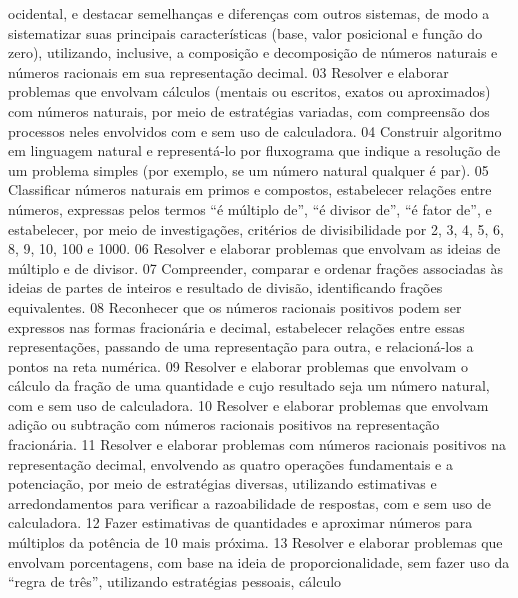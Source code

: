 {{{				ocidental, e destacar semelhanças e diferenças com outros sistemas, de modo a sistematizar suas
				principais características (base, valor posicional e função do zero), utilizando, inclusive, a composição
				e decomposição de números naturais e números racionais em sua representação decimal.
			}
			{03}{%
				Resolver e elaborar problemas que envolvam cálculos (mentais ou escritos, exatos
				ou aproximados) com números naturais, por meio de estratégias variadas, com compreensão
				dos processos neles envolvidos com e sem uso de calculadora.
			}
			{04}{%
				Construir algoritmo em linguagem natural e representá-lo por fluxograma que
				indique a resolução de um problema simples (por exemplo, se um número natural qualquer é
				par).
			}
			{05}{%
				Classificar números naturais em primos e compostos, estabelecer relações entre
				números, expressas pelos termos “é múltiplo de”, “é divisor de”, “é fator de”, e estabelecer, por
				meio de investigações, critérios de divisibilidade por \num{2}, \num{3}, \num{4}, \num{5}, \num{6}, \num{8}, \num{9}, \num{10}, \num{100} e \num{1000}.
			}
			{06}{%
				Resolver e elaborar problemas que envolvam as ideias de múltiplo e de divisor.
			}
			{07}{%
				Compreender, comparar e ordenar frações associadas às ideias de partes de
				inteiros e resultado de divisão, identificando frações equivalentes.
			}
			{08}{%
				Reconhecer que os números racionais positivos podem ser expressos nas formas
				fracionária e decimal, estabelecer relações entre essas representações, passando de uma
				representação para outra, e relacioná-los a pontos na reta numérica.
			}
			{09}{%
				Resolver e elaborar problemas que envolvam o cálculo da fração de uma
				quantidade e cujo resultado seja um número natural, com e sem uso de calculadora.
			}
			{10}{%
				Resolver e elaborar problemas que envolvam adição ou subtração com números
				racionais positivos na representação fracionária.
			}
			{11}{%
				Resolver e elaborar problemas com números racionais positivos na representação
				decimal, envolvendo as quatro operações fundamentais e a potenciação, por meio de
				estratégias diversas, utilizando estimativas e arredondamentos para verificar a razoabilidade de
				respostas, com e sem uso de calculadora.
			}
			{12}{%
				Fazer estimativas de quantidades e aproximar números para múltiplos da potência
				de 10 mais próxima.
			}
			{13}{%
				Resolver e elaborar problemas que envolvam porcentagens, com base na ideia
				de proporcionalidade, sem fazer uso da “regra de três”, utilizando estratégias pessoais, cálculo
}}}
